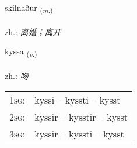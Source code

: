 \documentclass[frontgrid, backgrid]{flacards}\usepackage[]{graphicx}\usepackage[]{xcolor}
\begin{document}
\renewcommand{\flhead}{\vskip5pt \fboxsep=0pt {\small\bfseries\footnotesize Nafnorð | 名词}}
\renewcommand{\fcfoot}{\vskip5pt \fboxsep=0pt \hspace{2pt}{\small\bfseries\footnotesize 3K}}

\renewcommand{\blhead}{\vskip5pt {\small\bfseries\footnotesize Nafnorð | 名词 }}
\renewcommand{\bcfoot}{\vskip5pt \hspace{2pt}{\small\bfseries\footnotesize 3K}}


{skilnaður \small{\textsubscript{(\textit{m.})}} \\[1ex] %
\textphonetic{[scɪlnaðʏr]} \\
zh.: \emph{离婚；离开} \\  [2ex]
\renewcommand*{\arraystretch}{0.8}
}

\renewcommand{\flhead}{\vskip5pt \fboxsep=0pt {\small\bfseries\footnotesize Sagnorð | 动词}}
\renewcommand{\fcfoot}{\vskip5pt \fboxsep=0pt \hspace{2pt}{\small\bfseries\footnotesize 3K}}

\renewcommand{\blhead}{\vskip5pt {\small\bfseries\footnotesize Sagnorð | 动词 }}
\renewcommand{\bcfoot}{\vskip5pt \hspace{2pt}{\small\bfseries\footnotesize 3K}}


{kyssa \small{\textsubscript{(\textit{v.})}} \\[1ex] %
\textphonetic{[cʰɪsa]} \\
zh.: \emph{吻} \\  [2ex]
\renewcommand*{\arraystretch}{0.8}
\begin{tabular}{p{1cm}l}
\textsc{1sg}: & kyssi -- kyssti -- kysst \\ 
\textsc{2sg}: & kyssir -- kysstir -- kysst \\ 
\textsc{3sg}: & kyssir -- kyssti -- kysst \\ 
\end{tabular}
}
\end{document}
